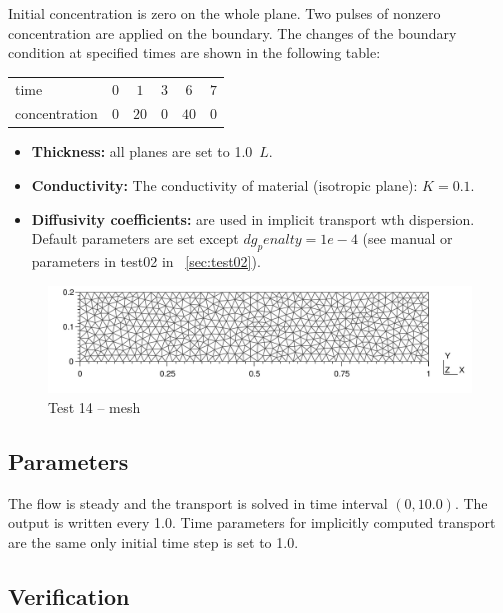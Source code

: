 Initial concentration is zero on the whole plane. Two pulses of nonzero concentration are applied on the boundary. The changes of the boundary condition at specified times are shown in the following table:
%
\begin{center}
  \begin{tabular}{|l|c|c|c|c|c|}
    \hline
    time & $0$ & $1$ & $3$ & $6$ & $7$\\
    concentration & $0$ & $20$ & $0$ & $40$ & $0$\\
    \hline
  \end{tabular}
\end{center}
%
\begin{itemize}
  \item \textbf{Thickness:} all planes are set to 1.0~$L$.
  \item \textbf{Conductivity:} The conductivity of material (isotropic plane): $K=0.1$.
  \item \textbf{Diffusivity coefficients:} are used in implicit transport wth dispersion. 
	Default parameters are set except $dg_penalty=1e-4$ (see manual or parameters in test02 in ~\ref{sec:test02}).
\end{itemize}
%
\begin{figure}[htb!]
\centering
\includegraphics[width=15cm]{tests_graphics/14_mesh.pdf}
\caption{Test 14 -- mesh}
\label{fig:test14_mesh}
\end{figure}
%
%
\subsection*{Parameters}
The flow is steady and the transport is solved in time interval $(0,10.0)$. The output is written every 1.0. Time parameters for implicitly computed transport are the same only initial time step is set to 1.0.

\subsection*{Verification}




